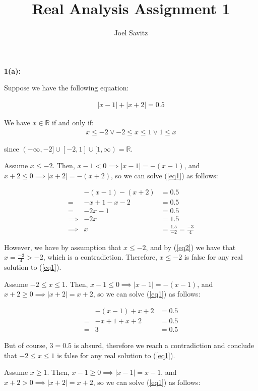 \documentclass{article}
\title{Real Analysis Assignment 1}
\author{Joel Savitz}
\newcommand{\reals}{\mathbb{R}}
\begin{document}
\maketitle

\textbf{1(a):}

Suppose we have the following equation:

\begin{align} \label{eq1}
	|x-1| + |x+2| = 0.5
\end{align}

We have $x \in \reals $ if and only if:
\begin{align} \label{eq0}
	x \le -2 \lor -2 \le x \le 1 \lor 1 \le x
\end{align}

since $(-\infty,-2] \cup [-2,1] \cup [1,\infty) = \reals$.

Assume $x \le -2$.
Then, $x-1 < 0 \implies |x-1| = -(x-1)$,
and $x+2 \le 0 \implies |x+2| = -(x+2)$,
so we can solve (\ref{eq1}) as follows:

\begin{align}
	& -(x-1) -(x+2) & = 0.5 \\
	= & -x+1 -x-2 & = 0.5 \\
	= & -2x-1 & = 0.5 \\
	\implies & -2x & = 1.5 \\
	\label{eq2} \implies & x & = \frac{1.5}{-2} = \frac{-3}{4}
\end{align}

However, we have by assumption that $x \le -2$,
and by (\ref{eq2}) we have that $x = \frac{-3}{4} > -2$,
which is a contradiction.
Therefore, $x \le -2$ is false for any real solution to (\ref{eq1}).

Assume $-2 \le x \le 1$.
Then, $x-1 \le 0 \implies |x-1| = -(x-1)$,
and $x+2 \geq 0 \implies |x+2| = x+2$,
so we can solve (\ref{eq1}) as follows:

\begin{align}
	& -(x-1) + x+2 & = 0.5 \\
	= & -x+1 + x+2 & = 0.5 \\
	= & 3 & = 0.5
\end{align}

But of course, $3 = 0.5$ is absurd,
therefore we reach a contradiction
and conclude that $-2 \le x \le 1$ is false for any real solution to (\ref{eq1}).

Assume $x \geq 1$.
Then, $x-1 \geq 0 \implies |x-1| = x-1$,
and $x+2 > 0 \implies |x+2| = x+2$,
so we can solve (\ref{eq1}) as follows:
\end{document}
